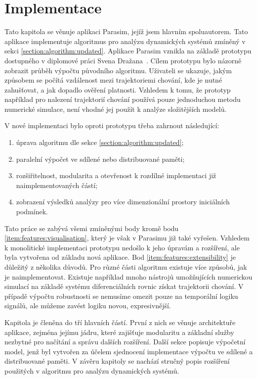 \chapter{Implementace}\label{chapter:implementation}

Tato kapitola se věnuje aplikaci Parasim, jejíž jsem hlavním spoluautorem.
Tato aplikace implementuje algoritmus pro
analýzu dynamických systémů zmíněný v sekci \ref{section:algorithm:updated}. Aplikace Parasim
vznikla na základě prototypu dostupného v diplomové práci Svena Dražana~\cite{drazan2011}. Cílem prototypu bylo ná\-zor\-ně
zobrazit průběh výpočtu původního algoritmu. Uživateli se ukazuje, jakým způsobem
se počítá vzdá\-le\-nost mezi trajektoriemi chování, kde je nutné zahušťovat, a jak dopadlo
ověření platnosti. Vzhledem k tomu, že prototyp například pro nalezení trajektorií chování používá pouze jednoduchou metodu
numerické simulace, není vhodné jej použít k analýze slo\-ži\-těj\-ších modelů.

V nové implementaci bylo oproti prototypu třeba zahrnout následující:

\begin{enumerate}
	\item	úprava algoritmu dle sekce \ref{section:algorithm:updated};
	\item	paralelní výpočet ve sdílené nebo distribuované paměti;
	\item	rozšiřitelnost, modularita a otevřenost k rozdílné implementaci již naimplementovaných částí;\label{item:features:extensibility}
	\item	zobrazení výsledků analýzy pro více dimenzionální prostory ini\-ciál\-ních podmínek.\label{item:features:visualisation}
\end{enumerate}

Tato práce se zabývá všemi zmíněnými body kromě bodu \ref{item:features:visualisation},
který je však v Parasimu již také vyřešen. Vzhledem k monolitické implementaci prototypu
nedošlo k jeho úpravám a rozšíření, ale byla vytvořena od zákla\-du nová aplikace.
Bod \ref{item:features:extensibility} je důležitý z několika důvodů. Pro různé části algoritmu
existuje více způsobů, jak je naimplementovat. Existuje například mnoho nástrojů umožňujících
numerickou simulací na základě systému diferenciálních rovnic získat trajektorii chování.
V případě výpočtu robustnosti se nemusíme omezit pouze na temporální logiku signálů,
ale můžeme zavést logiku novou, expresivněj\-ší.

Kapitola je členěna do tří hlavních částí. První z nich se věnuje architektuře aplikace,
zejména jejímu jádru, které zajišťuje modularitu a základní služby nezbytné pro načítání
a správu dalších rozšíření. Další sekce popisuje výpočetní model,
jenž byl vytvořen za účelem sjednocení implementace výpočtu ve sdílené a distribuované paměti.
V závěru kapitoly se na\-chá\-zí stručný popis rozšíření použitých v algoritmu pro analýzu
dynamických systémů.

